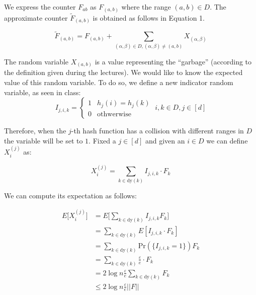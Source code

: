 \documentclass{article}
\begin{document}
\noindent We express the counter $F_{ab}$ as $F_{(a, b)}$ where the range $(a, b) \in D$. The approximate counter $\tilde{F}_{(a, b)}$ is obtained
as follows in Equation 1.

\begin{equation}
    \tilde{F}_{(a, b)} = F_{(a, b)} + \sum_{(\alpha, \beta) \in D,(\alpha, \beta) \ne (a, b)} X_{(\alpha, \beta)}
\end{equation}

\noindent The random variable $X_{(a, b)}$ is a value representing the ``garbage'' (according to the definition given during the lectures). We would like to know the expected value of this random variable.
To do so, we define a new indicator random variable, as seen in class:
\begin{equation*}
    I_{j,i,k} = \begin{cases}
        1 & h_j(i) = h_j(k) \\
        0 & \textrm{othwerwise}
    \end{cases} \; i, k \in D, j \in [d]
\end{equation*}

\noindent Therefore, when the $j$-th hash function has a collision with different ranges in $D$ the variable will be set to $1$. 
Fixed a $j \in [d]$ and given an $i \in D$ we can define $X_{i}^{(j)}$ as: 

\begin{equation*}
    X_{i}^{(j)} = \sum_{k \in \textrm{dy}(k)}I_{j, i, k} \cdot  F_k
\end{equation*}

\noindent We can compute its expectation as follows:

\begin{equation*}
    \begin{split}
        E\bigg[X_{i}^{(j)}\bigg] & = E\bigg[\sum_{k \in \textrm{dy}(k)}I_{j, i, k} F_k\bigg] \\
        & = \sum_{k \in \textrm{dy}(k)} E[I_{j, i, k} \cdot F_k] \\
        & = \sum_{k \in \textrm{dy}(k)} \textrm{Pr}(\{I_{j, i, k} = 1\}) F_k \\
        & = \sum_{k \in \textrm{dy}(k)} \frac{\varepsilon}{e} \cdot  F_k \\ 
        & = 2 \log n \frac{\varepsilon}{e} \sum_{k \in \textrm{dy}(k)} F_k \\
        & \le 2 \log n \frac{\varepsilon}{e} ||F||
    \end{split}
\end{equation*}
\end{document}
